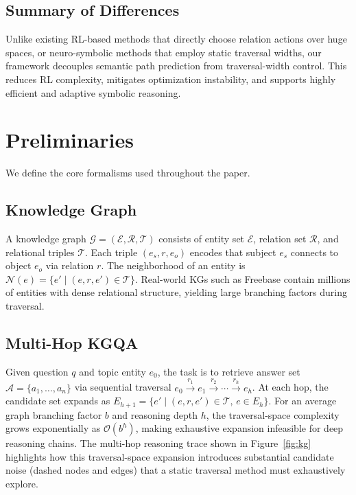 \documentclass[10pt,conference]{IEEEtran}
\begin{document}
\subsection{Summary of Differences}
Unlike existing RL-based methods that directly choose relation actions over huge spaces, or neuro-symbolic methods that employ static traversal widths, our framework decouples semantic path prediction from traversal-width control. This reduces RL complexity, mitigates optimization instability, and supports highly efficient and adaptive symbolic reasoning.


\section{Preliminaries}

We define the core formalisms used throughout the paper.

\subsection{Knowledge Graph}

A knowledge graph $\mathcal{G}=(\mathcal{E},\mathcal{R},\mathcal{T})$ consists of entity set $\mathcal{E}$, relation set $\mathcal{R}$, and relational triples $\mathcal{T}$. Each triple $(e_s,r,e_o)$ encodes that subject $e_s$ connects to object $e_o$ via relation $r$. The neighborhood of an entity is $\mathcal{N}(e) = \{ e' \mid (e,r,e') \in \mathcal{T} \}$. Real-world KGs such as Freebase contain millions of entities with dense relational structure, yielding large branching factors during traversal.

\subsection{Multi-Hop KGQA}

Given question $q$ and topic entity $e_0$, the task is to retrieve answer set $\mathcal{A}=\{a_1,\dots,a_n\}$ via sequential traversal $e_0 \xrightarrow{r_1} e_1 \xrightarrow{r_2} \cdots \xrightarrow{r_h} e_h$. At each hop, the candidate set expands as $E_{h+1} = \{ e' \mid (e,r,e') \in \mathcal{T},\, e \in E_h \}$. For an average graph branching factor $b$ and reasoning depth $h$, the traversal-space complexity grows exponentially as $\mathcal{O}(b^h)$, making exhaustive expansion infeasible for deep reasoning chains. The multi-hop reasoning trace shown in Figure~\ref{fig:kg} highlights how this traversal-space expansion introduces substantial candidate noise (dashed nodes and edges) that a static traversal method must exhaustively explore.
\end{document}
